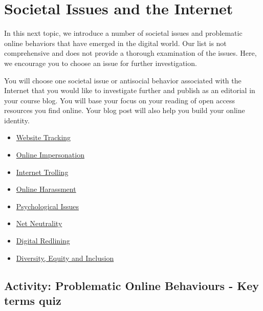 \documentclass[
]{book}
\providecommand{\tightlist}{%
  \setlength{\itemsep}{0pt}\setlength{\parskip}{0pt}}
\theoremstyle{definition}
\theoremstyle{definition}
\theoremstyle{definition}
\theoremstyle{definition}
\theoremstyle{remark}
\begin{document}
\hypertarget{societal-issues-and-the-internet}{%
\section{Societal Issues and the Internet}\label{societal-issues-and-the-internet}}

In this next topic, we introduce a number of societal issues and problematic online behaviors that have emerged in the digital world. Our list is not comprehensive and does not provide a thorough examination of the issues. Here, we encourage you to choose an issue for further investigation.

You will choose one societal issue or antisocial behavior associated with the Internet that you would like to investigate further and publish as an editorial in your course blog. You will base your focus on your reading of open access resources you find online. Your blog post will also help you build your online identity.

\begin{itemize}
\tightlist
\item
  \href{https://twu-innovation.github.io/inno101/sharing-your-knowledge.html\#website-tracking}{Website Tracking}
\item
  \href{https://twu-innovation.github.io/inno101/sharing-your-knowledge.html\#online-impersonation}{Online Impersonation}
\item
  \href{https://twu-innovation.github.io/inno101/sharing-your-knowledge.html\#internet-trolling}{Internet Trolling}
\item
  \href{https://twu-innovation.github.io/inno101/sharing-your-knowledge.html\#online-harassment}{Online Harassment}
\item
  \href{https://twu-innovation.github.io/inno101/sharing-your-knowledge.html\#psychological-issues}{Psychological Issues}
\item
  \href{https://twu-innovation.github.io/inno101/sharing-your-knowledge.html\#net-neutrality}{Net Neutrality}
\item
  \href{https://twu-innovation.github.io/inno101/sharing-your-knowledge.html\#digital-redlining}{Digital Redlining}
\item
  \href{https://twu-innovation.github.io/inno101/sharing-your-knowledge.html\#diversity-equity-inclusion}{Diversity, Equity and Inclusion}
\end{itemize}

\hypertarget{activity-problematic-online-behaviours---key-terms-quiz}{%
\subsection*{Activity: Problematic Online Behaviours - Key terms quiz}\label{activity-problematic-online-behaviours---key-terms-quiz}}
\end{document}
